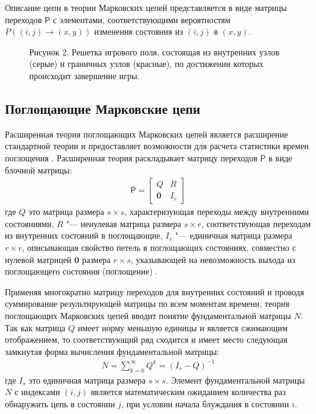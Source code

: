 Описание цепи в теории Марковских цепей представляется в виде матрицы переходов \cite{kemeny1983} $\mathsf{P}$ с элементами,
соответствующими вероятностям $P((i, j) \rightarrow (x, y))$ изменения состояния из $(i, j)$ в $(x, y)$.

\begin{figure}[ht]
    \caption{
        Рисунок 2. Решетка игрового поля, состоящая из внутренних узлов (серые) и граничных узлов (красные), по достижении которых происходит завершение игры.
    }\label{fig:game_field}
\end{figure}


\subsection{Поглощающие Марковские цепи}\label{subsec:ch1/sec3/sub2}

Расширенная теория поглощающих Марковских цепей является расширение стандартной теории и предоставляет возможности 
для расчета статистики времен поглощения \cite{kemeny1983}. 
Расширенная теория раскладывает матрицу переходов $\mathsf{P}$ в виде блочной матрицы:
\begin{equation}
    \begin{aligned}
    \mathsf{P}=
      \begin{bmatrix}
        Q & R \\
        \textbf{0} & I_r
      \end{bmatrix}
    \label{eq:P}
    \end{aligned}
\end{equation}
где $Q$ это матрица размера $s \times s$, характеризующая переходы между внутренними состояниями, 
$R$ "--- ненулевая матрица размера $s \times r$, соответствующая переходам из внутренних состояний в поглощающие, 
$I_r$ "--- единичная матрица размера $r \times r$, описывающая свойство петель в поглощающих состояниях, совместно с нулевой матрицей
$\textbf{0}$ размера $r \times s$, указывающей на невозможность выхода из поглощающего состояния (поглощение) \cite{kemeny1983}.

Применяя многократно матрицу переходов для внутренних состояний и проводя суммирование результирующей матрицы по всем моментам времени,
теория поглощающих Марковских цепей вводит понятие фундаментальной матрицы $N$. Так как матрица $Q$ имеет норму меньшую единицы и является сжимающим отображением,
то соответствующий ряд сходится и имеет место следующая замкнутая форма вычисления фундаментальной матрицы:
\begin{equation}
    \begin{aligned}
    N=\sum_{k=0}^{\infty} Q^k=(I_s-Q)^{-1}
    \label{eq:N}
    \end{aligned}
\end{equation}
где $I_s$ это единичная матрица размера $s \times s$. Элемент фундаментальной матрицы $N$ с индексами $(i, j)$ 
является математическим ожиданием количества раз обнаружить цепь в состоянии $j$, при условии начала блуждания в состоянии $i$.

